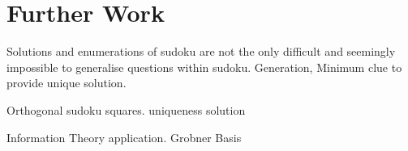 \documentclass[a4paper,11pt]{report}
\begin{document}
\chapter{Further Work}

Solutions and enumerations of sudoku are not the only difficult and seemingly impossible to generalise questions within sudoku. Generation, Minimum clue to provide unique solution.

Orthogonal sudoku squares. uniqueness solution 

Information Theory application.
Grobner Basis


\end{document}
